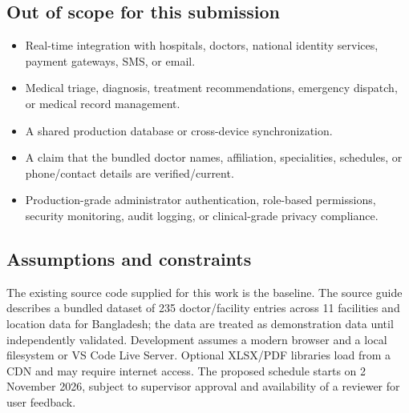 \documentclass[11pt,a4paper]{article}
\begin{document}
\subsection{Out of scope for this submission}
\begin{itemize}
  \item Real-time integration with hospitals, doctors, national identity services, payment gateways, SMS, or email.
  \item Medical triage, diagnosis, treatment recommendations, emergency dispatch, or medical record management.
  \item A shared production database or cross-device synchronization.
  \item A claim that the bundled doctor names, affiliation, specialities, schedules, or phone/contact details are verified/current.
  \item Production-grade administrator authentication, role-based permissions, security monitoring, audit logging, or clinical-grade privacy compliance.
\end{itemize}

\subsection{Assumptions and constraints}
The existing source code supplied for this work is the baseline. The source guide describes a bundled dataset of 235 doctor/facility entries across 11 facilities and location data for Bangladesh; the data are treated as demonstration data until independently validated. Development assumes a modern browser and a local filesystem or VS Code Live Server. Optional XLSX/PDF libraries load from a CDN and may require internet access. The proposed schedule starts on 2 November 2026, subject to supervisor approval and availability of a reviewer for user feedback.
\end{document}
